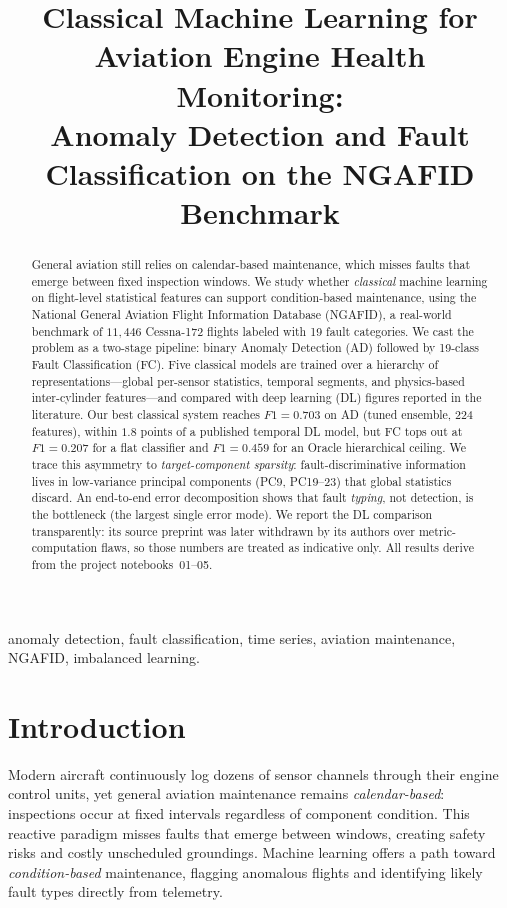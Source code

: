 \documentclass[conference]{IEEEtran}
\title{Classical Machine Learning for Aviation Engine Health Monitoring:\\
       Anomaly Detection and Fault Classification on the NGAFID Benchmark}
\author{
    \IEEEauthorblockN{Iván Barbosa Mejía}
    \IEEEauthorblockA{
        \textit{Department of Computer Science} \\
        \textit{Naval Postgraduate School} \\
        Monterey, California, USA \\
        CS3315 --- Introduction to Machine Learning \& Big Data \\
        \texttt{https://github.com/Barbosa12/NGAFID}
    }
}
\begin{document}
\maketitle

\begin{abstract}
General aviation still relies on calendar-based maintenance, which misses faults
that emerge between fixed inspection windows. We study whether \emph{classical}
machine learning on flight-level statistical features can support condition-based
maintenance, using the National General Aviation Flight Information Database
(NGAFID), a real-world benchmark of $11{,}446$ Cessna-172 flights labeled with 19
fault categories. We cast the problem as a two-stage pipeline: binary Anomaly
Detection (AD) followed by 19-class Fault Classification (FC). Five classical
models are trained over a hierarchy of representations---global per-sensor
statistics, temporal segments, and physics-based inter-cylinder features---and
compared with deep learning (DL) figures reported in the literature. Our best
classical system reaches $F1=0.703$ on AD (tuned ensemble, 224 features), within
$1.8$ points of a published temporal DL model, but FC tops out at $F1=0.207$ for
a flat classifier and $F1=0.459$ for an Oracle hierarchical ceiling. We trace this
asymmetry to \emph{target-component sparsity}: fault-discriminative information
lives in low-variance principal components (PC9, PC19--23) that global statistics
discard. An end-to-end error decomposition shows that fault \emph{typing}, not
detection, is the bottleneck (the largest single error mode). We report the DL
comparison transparently: its source preprint was later withdrawn by its authors
over metric-computation flaws, so those numbers are treated as indicative only.
All results derive from the project notebooks~01--05.
\end{abstract}

\begin{IEEEkeywords}
anomaly detection, fault classification, time series, aviation maintenance,
NGAFID, imbalanced learning.
\end{IEEEkeywords}

\section{Introduction}
\label{sec:intro}
Modern aircraft continuously log dozens of sensor channels through their engine
control units, yet general aviation maintenance remains \emph{calendar-based}:
inspections occur at fixed intervals regardless of component condition. This
reactive paradigm misses faults that emerge between windows, creating safety
risks and costly unscheduled groundings. Machine learning offers a path toward
\emph{condition-based} maintenance, flagging anomalous flights and identifying
likely fault types directly from telemetry.
\end{document}
